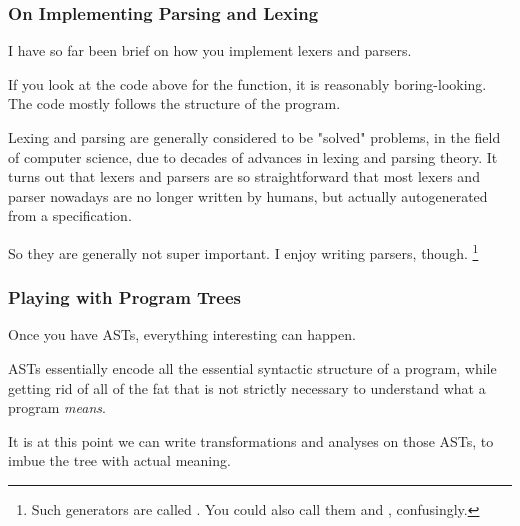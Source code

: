 \documentclass[aspectratio=169]{beamer}
\begin{document}
\begin{frame}[fragile]
  \frametitle{On Implementing Parsing and Lexing}

  I have so far been brief on how you implement lexers and parsers.

  \vspace{\fill}

  If you look at the code above for the  function, it is
  reasonably boring-looking. The code mostly follows the structure of
  the program.

  \vspace{\fill}

  Lexing and parsing are generally considered to be "solved" problems, in the
  field of computer science, due to decades of advances in lexing and parsing
  theory. It turns out that lexers and parsers are so straightforward that most
  lexers and parser nowadays are no longer written by humans, but actually
  autogenerated from a specification.

  \vspace{\fill}

  So they are generally not super important. I enjoy writing parsers, though.
  \footnote{Such generators are called .
  You could also call them  and ,
  confusingly.}
\end{frame}

\begin{frame}[fragile]
  \frametitle{Playing with Program Trees}

  Once you have ASTs, everything interesting can happen.

  \vspace{\fill}

  ASTs essentially encode all the essential syntactic structure of a program,
  while getting rid of all of the fat that is not strictly necessary to understand
  what a program \textit{means}.

  \vspace{\fill}

  It is at this point we can write transformations and analyses on those ASTs,
  to imbue the tree with actual meaning.

  \vspace{\fill}

\end{frame}
\end{document}

